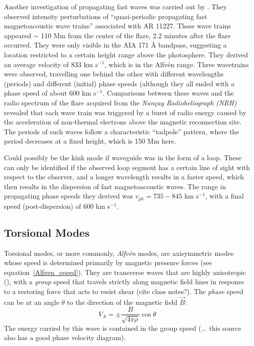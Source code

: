 \documentclass[preprint2]{aastex}
\begin{document}
Another investigation of propagating fast waves was carried out by
\cite{pfw_2}.
They observed intensity perturbations of ``quasi-periodic propagating fast
magnetoacoustic wave trains'' associated with AR 11227.
These wave trains appeared $\sim$ 110 Mm from the center of the flare,
2.2 minutes after the flare occurred.
They were only visible in the AIA 171 \AA{} bandpass, suggesting a
location restricted to a certain height range above the photosphere.
They derived an average velocity of
833 km s$^{-1}$, which is in the Alfv\'en range.
Three wavetrains were observed, travelling one behind the other
with different wavelengths (periods) and different (initial) phase
speeds (although they all ended with a phase speed of about 600 km s$^{-1}$.
Comparisons between these waves and the radio spectrum of the flare
acquired from the \emph{Nan\c{c}ay Radioheliograph (NRH)}
revealed that each wave train was triggered by a burst of radio energy
caused by the acceleration of non-thermal electrons above the
magnetic reconnection site. The periods of such waves follow a
characteristic ``tadpole'' pattern, where the period decreases at
a fixed height, which is 150 Mm here.

Could possibly be the kink mode if waveguide was in
the form of a loop. These can only be identified if the observed loop
segment has a certain line of sight with respect to the observer,
and a longer wavelength results in a faster speed, which then results
in the dispersion of fast magnetoacoustic waves. The range in
propagating phase speeds they derived was
$ v_{ph} = 735 - 845 $ km s$^{-1}$, with a final speed
(post-dispersion) of 600 km s$^{-1}$.


\subsection{Torsional Modes}
Torsional modes, or more commonly, \emph{Alfv\'en} modes, are axisymmetric
modes whose speed is determined primarily by magnetic pressure forces
(see equation~\ref{Alfven_speed}).
They are transverse waves that are highly anisotropic (\cite{Goossens}),
with a \emph{group} speed that
travels strictly along magnetic field lines in response
to a restoring force that acts to resist shear (cite class notes?).
The \emph{phase} speed can be at an angle $\theta$ to the direction
of the magnetic field $\vec{B}$:
\begin{equation}
    V_A = \pm \frac{B}{\sqrt{4\pi\rho}}\cos\theta
\end{equation}
The energy carried by this wave is contained in the group speed
(\cite{Somov}$\ldots$ this source also has a good phase velocity
diagram).
\end{document}

